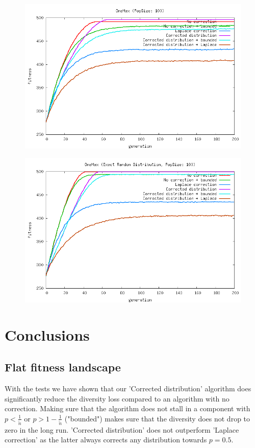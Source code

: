 \documentclass[a4paper,twoside]{report}
\begin{document}
\begin{figure}[htp]
\includegraphics[scale=0.5]{graph_onemax006_fitness.png}
\end{figure}
\begin{figure}[htp]
\includegraphics[scale=0.5]{graph_onemax007_fitness.png}
\end{figure}



\newpage
\section{Conclusions}

\subsection{Flat fitness landscape}

With the tests we have shown that our 'Corrected distribution' algorithm does significantly reduce the diversity loss compared to an algorithm with no correction. Making sure that the algorithm does not stall in a component with \(p < \frac{1}{\tilde{n}}\) or \(p > 1 - \frac{1}{\tilde{n}}\) ("bounded") makes sure that the diversity does not drop to zero in the long run. 'Corrected distribution' does not outperform 'Laplace correction' as the latter always corrects any distribution towards \(p = 0.5\).
\end{document}
